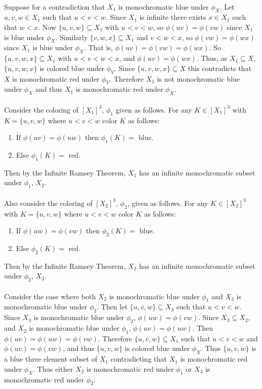 \documentclass[letterpaper,12pt,oneside,onecolumn]{article}
\begin{document}
\paragraph{}
Suppose for a contradiction that $X_1$ is monochromatic blue under $\phi_X$. Let $u,v,w \in X_1$ such that $u<v<w$. Since $X_1$ is infinite there exists $x \in X_1$ such that $w<x$. Now $\{u,v,w\} \subseteq X_1$ with $u<v<w$, so $\phi(uv) = \phi(vw)$ since $X_1$ is blue under $\phi_X$. Similarly $\{v,w,x\} \subseteq X_1$ and $v<w<x$, so $\phi(vw) = \phi(wx)$ since $X_1$ is blue under $\phi_X$. That is, $\phi(uv) = \phi(vw) = \phi(wx)$. So $\{u,v,w,x\} \subseteq X_1$ with $u<v<w<x$, and $\phi(uv) = \phi(wx)$. Thus, as $X_1 \subseteq X$, $\{u,v,w,x\}$ is colored blue under $\phi_V$. Since $\{u,v,w,x\} \subseteq X$ this contradicts that $X$ is monochromatic red under $\phi_V$. Therefore $X_1$ is not monochromatic blue under $\phi_X$ and thus $X_1$ is monochromatic red under $\phi_X$.
\paragraph{}
Consider the coloring of $[X_1]^3$, $\phi_1$ given as follows. For any $K \in [X_1]^3$ with $K = \{u,v,w\}$ where $u<v<w$ color $K$ as follows:
\begin{enumerate}
\item If $\phi(uv) = \phi(uw)$ then $\phi_1(K)=$ blue.
\item Else $\phi_1(K)=$  red.
\end{enumerate}
Then by the Infinite Ramsey Theorem, $X_1$ has an infinite monochromatic subset under $\phi_1$, $X_2$.
\paragraph{}
Also consider the coloring of $[X_2]^3$, $\phi_2$, given as follows. For any $K \in [X_2]^3$ with $K = \{u,v,w\}$ where $u<v<w$ color $K$ as follows:
\begin{enumerate}
\item If $\phi(uw) = \phi(vw)$ then $\phi_2(K)=$ blue.
\item Else $\phi_2(K)=$ red.
\end{enumerate}
Then by the Infinite Ramsey Theorem, $X_2$ has an infinite monochromatic subset under $\phi_2$, $X_3$.
\paragraph{}
Consider the case where both $X_2$ is monochromatic blue under $\phi_1$ and $X_3$ is monochromatic blue under $\phi_2$. Then let $\{u,v,w\} \subseteq X_3$ such that $u<v<w$. Since $X_3$ is monochromatic blue under $\phi_2$, $\phi(uw) = \phi(vw)$. Since $X_3 \subseteq X_2$, and $X_2$ is monochromatic blue under $\phi_1$, $\phi(uv) = \phi(uw)$. Then $\phi(uv) = \phi(uw) = \phi(vw)$. Therefore $\{u,v,w\} \subseteq X_1$ such that $u<v<w$ and $\phi(uv) = \phi(vw)$, and thus $\{u,v,w\}$ is colored blue under $\phi_X$. Thus $\{u,v,w\}$ is a blue three element subset of $X_1$ contradicting that $X_1$ is monochromatic red under $\phi_X$. Thus either $X_2$ is monochromatic red under $\phi_1$ or $X_3$ is monochromatic red under $\phi_2$.
\end{document}
